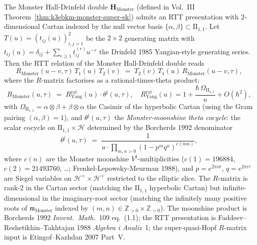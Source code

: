 \begin{remark}
\label{rem:bfac-monster-rtt-rank2}
The Monster Hall-Drinfeld double $\mathbf H_{\mathrm{Monster}}$
(defined in Vol.~III Theorem~\ref{thm:k3ebkm-monster-super-ek}) admits
an RTT presentation with $2$-dimensional Cartan indexed by the null
vector basis $\{\alpha,\beta\}\subset\mathrm{II}_{1,1}$. Let
$T(u) = (t_{ij}(u))_{i,j=1}^{2}$ be the $2\times 2$ generating
matrix with $t_{ij}(u) = \delta_{ij} + \sum_{r\geq 1} t_{ij}^{(r)} u^{-r}$
the Drinfeld 1985 Yangian-style generating series. Then the RTT
relation of the Monster Hall-Drinfeld double reads
\begin{equation}
\label{eq:bfac-monster-RTT}
 R_{\mathrm{Monster}}(u-v,\tau)\, T_1(u)\, T_2(v)
 \;=\;
 T_2(v)\, T_1(u)\, R_{\mathrm{Monster}}(u-v,\tau),
\end{equation}
where the $R$-matrix factorises as a rational-times-theta product:
\begin{equation}
\label{eq:bfac-R-monster-factor}
 R_{\mathrm{Monster}}(u,\tau)
 \;=\;
 R^{\mathrm{rat}}_{\mathrm{Yang}}(u)\cdot\theta^{\mathrm{j}}(u,\tau),
 \quad
 R^{\mathrm{rat}}_{\mathrm{Yang}}(u) = 1 + \frac{\hbar\,\Omega_{\mathrm{II}_{1,1}}}{u} + O(\hbar^2),
\end{equation}
with $\Omega_{\mathrm{II}_{1,1}} = \alpha\otimes\beta + \beta\otimes\alpha$
the Casimir of the hyperbolic Cartan (using the Gram pairing
$(\alpha,\beta) = 1$), and $\theta^{\mathrm j}(u,\tau)$ the
\emph{Monster-moonshine theta cocycle}: the scalar cocycle on
$\mathrm{II}_{1,1}\times\mathcal H$ determined by the Borcherds 1992
denominator
\[
 \theta^{\mathrm j}(u,\tau)
 \;=\;
 \frac{1}{u\cdot\prod_{m,n>0}(1 - p^m q^n)^{c(mn)}},
\]
where $c(n)$ are the Monster moonshine $V^\natural$-multiplicities
($c(1) = 196884$, $c(2) = 21493760$, \ldots; Frenkel-Lepowsky-Meurman
1988), and $p = e^{2\pi i\sigma}$, $q = e^{2\pi i\tau}$ are
Siegel variables on $\mathcal H^+\times\mathcal H^+$ restricted to
the elliptic slice. The $R$-matrix is rank-$2$ in the Cartan sector
(matching the $\mathrm{II}_{1,1}$ hyperbolic Cartan) but infinite-dimensional
in the imaginary-root sector (matching the infinitely many positive
roots of $\mathfrak m_{\mathrm{Monster}}$ indexed by
$(m,n)\in\mathbb Z_{>0}\times\mathbb Z_{>0}$). The moonshine product
is Borcherds 1992 \emph{Invent.\ Math.}~109 eq.~(1.1); the RTT
presentation is Faddeev--Reshetikhin--Takhtajan 1988
\emph{Algebra i Analiz}~1; the super-quasi-Hopf $R$-matrix input is
Etingof--Kazhdan 2007 Part~V.
\end{remark}

